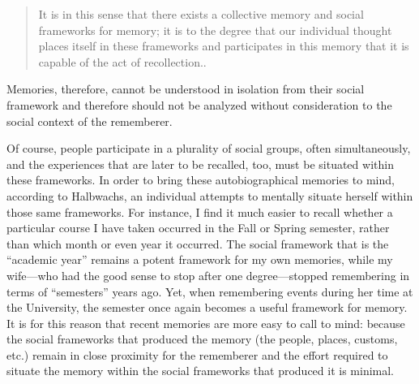\begin{quote}
It is in this sense that there exists a collective memory and social
frameworks for memory; it is to the degree that our individual thought
places itself in these frameworks and participates in this memory that
it is capable of the act of recollection.\autocite[PAGE]{halbwachs1992}.
\end{quote}

Memories, therefore, cannot be understood in isolation from their social
framework and therefore should not be analyzed without consideration to
the social context of the rememberer.

Of course, people participate in a plurality of social groups, often
simultaneously, and the experiences that are later to be recalled, too,
must be situated within these frameworks. In order to bring these
autobiographical memories to mind, according to Halbwachs, an individual
attempts to mentally situate herself within those same frameworks. For
instance, I find it much easier to recall whether a particular course I
have taken occurred in the Fall or Spring semester, rather than which
month or even year it occurred. The social framework that is the
``academic year'' remains a potent framework for my own memories, while
my wife---who had the good sense to stop after one degree---stopped
remembering in terms of ``semesters'' years ago. Yet, when remembering
events during her time at the University, the semester once again
becomes a useful framework for memory. It is for this reason that recent
memories are more easy to call to mind: because the social frameworks
that produced the memory (the people, places, customs, etc.) remain in
close proximity for the rememberer and the effort required to situate
the memory within the social frameworks that produced it is
minimal.\autocite[52]{halbwachs1992}


